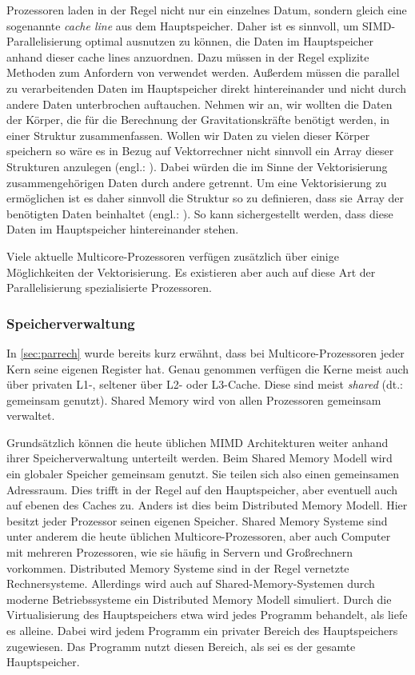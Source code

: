       Prozessoren laden in der Regel nicht nur ein einzelnes Datum, sondern gleich eine sogenannte \textit{cache line} aus dem Hauptspeicher. Daher ist es sinnvoll, 
      um SIMD-Parallelisierung optimal ausnutzen zu können, die Daten im Hauptspeicher anhand dieser cache lines anzuordnen. Dazu müssen in der Regel explizite Methoden zum Anfordern von 
       verwendet werden. Außerdem müssen die parallel zu verarbeitenden Daten im Hauptspeicher direkt hintereinander und nicht durch andere Daten 
      unterbrochen auftauchen. Nehmen wir an, wir wollten die Daten der Körper, die für die Berechnung der Gravitationskräfte benötigt werden, in einer Struktur zusammenfassen. Wollen wir
      Daten zu vielen dieser Körper speichern so wäre es in Bezug auf Vektorrechner nicht sinnvoll ein Array dieser Strukturen anzulegen (engl.: ).
      Dabei würden die im Sinne der Vektorisierung zusammengehörigen Daten durch andere getrennt. Um eine Vektorisierung zu ermöglichen ist es daher sinnvoll die Struktur so zu definieren,
      dass sie Array der benötigten Daten beinhaltet (engl.: ). So kann sichergestellt werden, dass diese Daten im Hauptspeicher hintereinander stehen.
      \citep{hpcskript, architect}
      
      Viele aktuelle Multicore-Prozessoren verfügen zusätzlich über einige Möglichkeiten der Vektorisierung. Es existieren aber auch auf diese Art der Parallelisierung spezialisierte Prozessoren.
      \citep{architect}
      
      \subsubsection{Speicherverwaltung}
      \label{sec:speicher}
	In \autoref{sec:parrech} wurde bereits kurz erwähnt, dass bei Multicore-Prozessoren jeder Kern seine eigenen Register hat. Genau genommen verfügen die Kerne meist auch über privaten L1-,
	seltener über L2- oder L3-Cache. Diese sind meist \textit{shared} (dt.: gemeinsam genutzt). Shared Memory wird von allen Prozessoren gemeinsam verwaltet.
	
	Grundsätzlich können die heute üblichen MIMD Architekturen weiter anhand ihrer Speicherverwaltung unterteilt werden. Beim Shared Memory Modell wird ein globaler
	Speicher gemeinsam genutzt. Sie teilen sich also einen gemeinsamen Adressraum. Dies trifft in der Regel auf den Hauptspeicher, aber eventuell auch auf ebenen des Caches zu.
	Anders ist dies beim Distributed Memory Modell. Hier besitzt jeder Prozessor seinen eigenen Speicher. Shared Memory Systeme sind unter anderem die heute üblichen Multicore-Prozessoren,
	aber auch Computer mit mehreren Prozessoren, wie sie häufig in Servern und Großrechnern vorkommen. Distributed Memory Systeme sind in der Regel vernetzte Rechnersysteme. Allerdings wird
	auch auf Shared-Memory-Systemen durch moderne Betriebssysteme ein Distributed Memory Modell simuliert. Durch die Virtualisierung des Hauptspeichers etwa wird jedes Programm behandelt,
	als liefe es alleine. Dabei wird jedem Programm ein privater Bereich des Hauptspeichers zugewiesen. Das Programm nutzt diesen Bereich, als sei es der gesamte Hauptspeicher. \citep{korbler}
	
